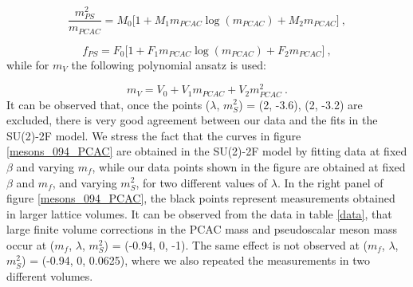 \begin{equation}
\frac{m_{PS}^2}{m_{PCAC}} = M_0 \bigl[ 1 + M_1 m_{PCAC} \log (m_{PCAC}) + M_2 m_{PCAC} \bigr] \: ,
\label{fit_PS}
\end{equation}

\begin{equation}
f_{PS} = F_0 \bigl[ 1+ F_1 m_{PCAC} \log (m_{PCAC}) + F_2 m_{PCAC} \bigr] \: ,
\label{fit_fPS}
\end{equation}
%
while for $m_V$ the following polynomial ansatz is used:

\begin{equation}
m_V = V_0 + V_1 m_{PCAC} + V_2 m_{PCAC}^2 \: .
\label{fit_V}
\end{equation}
%
It can be observed that, once the points ($\lambda$, $m_S^2$) = (2, -3.6), (2, -3.2) are excluded, there is very good agreement between our data and the fits in the SU(2)-2F model. We stress the fact that the curves in figure \ref{mesons_094_PCAC} are obtained in the SU(2)-2F model by fitting data at fixed $\beta$ and varying $m_f$, while our data points shown in the figure are obtained at fixed $\beta$ and $m_f$, and varying $m_S^2$, for two different values of $\lambda$. In the right panel of figure \ref{mesons_094_PCAC}, the black points represent measurements obtained in larger lattice volumes. It can be observed from the data in table \ref{data}, that large finite volume corrections in the PCAC mass and pseudoscalar meson mass occur at ($m_f$, $\lambda$, $m_S^2$) = (-0.94, 0, -1). The same effect is not observed at ($m_f$, $\lambda$, $m_S^2$) = (-0.94, 0, 0.0625), where we also repeated the measurements in two different volumes. 


